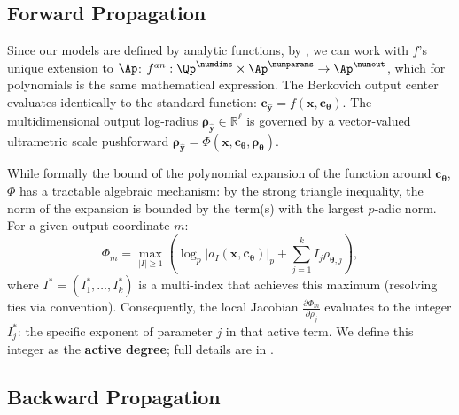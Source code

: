 \subsection{Forward Propagation}

Since our models are defined by analytic functions, by , we can work with $f$'s unique extension to $\Ap$: $f^{an}: \Qp^\numdims \times \Ap^\numparams \to \Ap^\numout$, which for polynomials is the same mathematical expression. The Berkovich output center evaluates identically to the standard function: $\mathbf{c}_{\hat{\mathbf{y}}} = f(\mathbf{x}, \mathbf{c}_{\boldsymbol{\theta}})$. The multidimensional output log-radius $\boldsymbol{\rho}_{\hat{\mathbf{y}}} \in \mathbb{R}^\ell$ is governed by a vector-valued ultrametric scale pushforward $\boldsymbol{\rho}_{\hat{\mathbf{y}}} = \Phi(\mathbf{x}, \mathbf{c}_{\boldsymbol{\theta}}, \boldsymbol{\rho}_{\boldsymbol{\theta}})$.

While formally the bound of the polynomial expansion of the function around $\mathbf{c}_{\boldsymbol{\theta}}$, $\Phi$ has a tractable algebraic mechanism: by the strong triangle inequality, the norm of the expansion is bounded by the term(s) with the largest $p$-adic norm. For a given output coordinate $m$:
\begin{equation}
    \Phi_m = \max_{|I| \ge 1} \left( \log_p |a_I(\mathbf{x}, \mathbf{c}_{\boldsymbol{\theta}})|_p + \sum_{j=1}^k I_j \rho_{\boldsymbol{\theta}, j} \right),
\end{equation}
where $I^* = (I^*_1, \dotsc, I^*_k)$ is a multi-index that achieves this maximum (resolving ties via convention). Consequently, the local Jacobian $\frac{\partial \Phi_m}{\partial \rho_j}$ evaluates to the integer $I^*_j$: the specific exponent of parameter $j$ in that active term. We define this integer as the \textbf{active degree}; full details are in .


\subsection{Backward Propagation}

